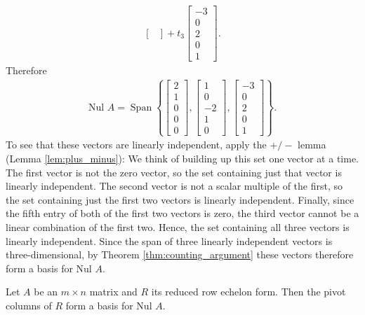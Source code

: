 \documentclass[12pt,letterpaper,reqno]{article}
\numberwithin{equation}{section}
\newcommand{\Nul}{\text{Nul }}
\DeclareMathOperator{\Span}{Span}
\begin{document}
\begin{example}
\begin{align*}
\begin{bmatrix}
	\end{bmatrix}+t_3\begin{bmatrix}
		-3 \\ 0 \\ 2 \\ 0 \\1
	\end{bmatrix}.
\end{align*}
Therefore
\begin{align*}
	\Nul A=\Span\left\{\begin{bmatrix}
		2 \\ 1 \\ 0 \\ 0 \\0
	\end{bmatrix},\begin{bmatrix}
		1 \\ 0 \\ -2 \\ 1 \\0
	\end{bmatrix},\begin{bmatrix}
		-3 \\ 0 \\ 2 \\ 0 \\1
	\end{bmatrix}\right\}.
\end{align*}
To see that these vectors are linearly independent, apply the $+/-$ lemma (Lemma \ref{lem:plus_minus}): We think of building up this set one vector at a time. The first vector is not the zero vector, so the set containing just that vector is linearly independent. The second vector is not a scalar multiple of the first, so the set containing just the first two vectors is linearly independent. Finally, since the fifth entry of both of the first two vectors is zero, the third vector cannot be a linear combination of the first two. Hence, the set containing all three vectors is linearly independent. Since the span of three linearly independent vectors is three-dimensional, by Theorem \ref{thm:counting_argument} these vectors therefore form a basis for $\Nul A$. 
\end{example}

\begin{thm}\label{thm:basis_for_nul_a}
	Let $A$ be an $m \times n$ matrix and $R$ its reduced row echelon form. Then the pivot columns of $R$ form a basis for $\Nul A$.
\end{thm}
\end{document}
